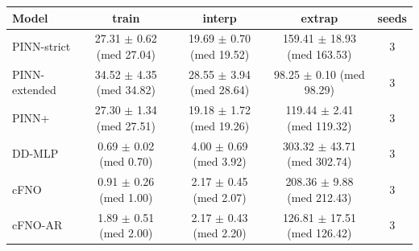 \begin{tabular}{lcccc}
\toprule
Model & train & interp & extrap & seeds \\
\midrule
PINN-strict & 27.31 $\pm$ 0.62 (med 27.04) & 19.69 $\pm$ 0.70 (med 19.52) & 159.41 $\pm$ 18.93 (med 163.53) & 3 \\
PINN-extended & 34.52 $\pm$ 4.35 (med 34.82) & 28.55 $\pm$ 3.94 (med 28.64) & 98.25 $\pm$ 0.10 (med 98.29) & 3 \\
PINN+ & 27.30 $\pm$ 1.34 (med 27.51) & 19.18 $\pm$ 1.72 (med 19.26) & 119.44 $\pm$ 2.41 (med 119.32) & 3 \\
DD-MLP & 0.69 $\pm$ 0.02 (med 0.70) & 4.00 $\pm$ 0.69 (med 3.92) & 303.32 $\pm$ 43.71 (med 302.74) & 3 \\
cFNO & 0.91 $\pm$ 0.26 (med 1.00) & 2.17 $\pm$ 0.45 (med 2.07) & 208.36 $\pm$ 9.88 (med 212.43) & 3 \\
cFNO-AR & 1.89 $\pm$ 0.51 (med 2.00) & 2.17 $\pm$ 0.43 (med 2.20) & 126.81 $\pm$ 17.51 (med 126.42) & 3 \\
\bottomrule
\end{tabular}
